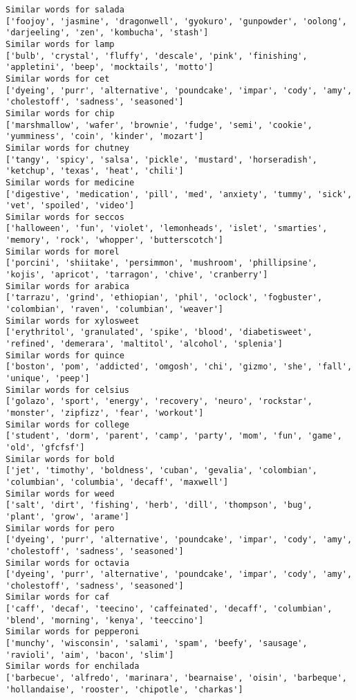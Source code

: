 \documentclass[11pt]{article}
\begin{document}
\begin{Verbatim}[commandchars=\\\{\}]
Similar words for salada
['foojoy', 'jasmine', 'dragonwell', 'gyokuro', 'gunpowder', 'oolong', 'darjeeling', 'zen', 'kombucha', 'stash']
Similar words for lamp
['bulb', 'crystal', 'fluffy', 'descale', 'pink', 'finishing', 'appletini', 'beep', 'mocktails', 'motto']
Similar words for cet
['dyeing', 'purr', 'alternative', 'poundcake', 'impar', 'cody', 'amy', 'cholestoff', 'sadness', 'seasoned']
Similar words for chip
['marshmallow', 'wafer', 'brownie', 'fudge', 'semi', 'cookie', 'yumminess', 'coin', 'kinder', 'mozart']
Similar words for chutney
['tangy', 'spicy', 'salsa', 'pickle', 'mustard', 'horseradish', 'ketchup', 'texas', 'heat', 'chili']
Similar words for medicine
['digestive', 'medication', 'pill', 'med', 'anxiety', 'tummy', 'sick', 'vet', 'spoiled', 'video']
Similar words for seccos
['halloween', 'fun', 'violet', 'lemonheads', 'islet', 'smarties', 'memory', 'rock', 'whopper', 'butterscotch']
Similar words for morel
['porcini', 'shiitake', 'persimmon', 'mushroom', 'phillipsine', 'kojis', 'apricot', 'tarragon', 'chive', 'cranberry']
Similar words for arabica
['tarrazu', 'grind', 'ethiopian', 'phil', 'oclock', 'fogbuster', 'colombian', 'raven', 'columbian', 'weaver']
Similar words for xylosweet
['erythritol', 'granulated', 'spike', 'blood', 'diabetisweet', 'refined', 'demerara', 'maltitol', 'alcohol', 'splenia']
Similar words for quince
['boston', 'pom', 'addicted', 'omgosh', 'chi', 'gizmo', 'she', 'fall', 'unique', 'peep']
Similar words for celsius
['golazo', 'sport', 'energy', 'recovery', 'neuro', 'rockstar', 'monster', 'zipfizz', 'fear', 'workout']
Similar words for college
['student', 'dorm', 'parent', 'camp', 'party', 'mom', 'fun', 'game', 'old', 'gfcfsf']
Similar words for bold
['jet', 'timothy', 'boldness', 'cuban', 'gevalia', 'colombian', 'columbian', 'columbia', 'decaff', 'maxwell']
Similar words for weed
['salt', 'dirt', 'fishing', 'herb', 'dill', 'thompson', 'bug', 'plant', 'grow', 'arame']
Similar words for pero
['dyeing', 'purr', 'alternative', 'poundcake', 'impar', 'cody', 'amy', 'cholestoff', 'sadness', 'seasoned']
Similar words for octavia
['dyeing', 'purr', 'alternative', 'poundcake', 'impar', 'cody', 'amy', 'cholestoff', 'sadness', 'seasoned']
Similar words for caf
['caff', 'decaf', 'teecino', 'caffeinated', 'decaff', 'columbian', 'blend', 'morning', 'kenya', 'teeccino']
Similar words for pepperoni
['munchy', 'wisconsin', 'salami', 'spam', 'beefy', 'sausage', 'ravioli', 'aim', 'bacon', 'slim']
Similar words for enchilada
['barbecue', 'alfredo', 'marinara', 'bearnaise', 'oisin', 'barbeque', 'hollandaise', 'rooster', 'chipotle', 'charkas']

\end{Verbatim}
\end{document}
